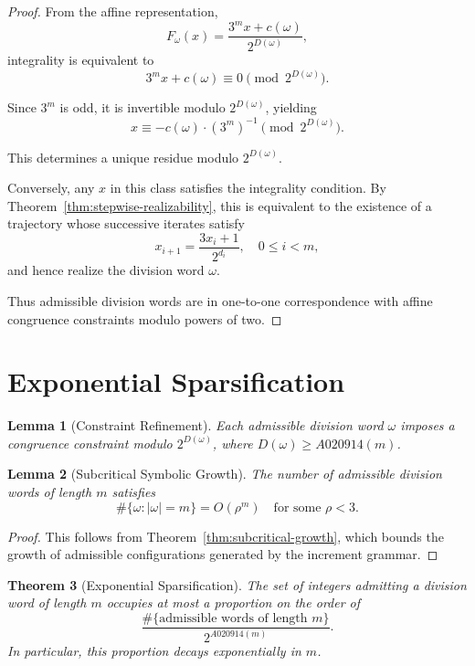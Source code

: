\documentclass[12pt, oneside]{article}
\numberwithin{equation}{section}
\theoremstyle{definition}
\theoremstyle{plain}
\newtheorem{theorem}{Theorem}[section]
\newtheorem{lemma}[theorem]{Lemma}
\theoremstyle{remark}
\begin{document}
\begin{proof}
From the affine representation,
\[
F_\omega(x) = \frac{3^m x + c(\omega)}{2^{D(\omega)}},
\]
integrality is equivalent to
\[
3^m x + c(\omega) \equiv 0 \pmod{2^{D(\omega)}}.
\]

Since $3^m$ is odd, it is invertible modulo $2^{D(\omega)}$, yielding
\[
x \equiv -c(\omega) \cdot (3^m)^{-1} \pmod{2^{D(\omega)}}.
\]

This determines a unique residue modulo $2^{D(\omega)}$.

Conversely, any $x$ in this class satisfies the integrality condition.
By Theorem~\ref{thm:stepwise-realizability}, this is equivalent to the
existence of a trajectory whose successive iterates satisfy
\[
x_{i+1} = \frac{3x_i+1}{2^{d_i}}, \quad 0 \le i < m,
\]
and hence realize the division word $\omega$.

Thus admissible division words are in one-to-one correspondence with affine
congruence constraints modulo powers of two.
\end{proof}

\section{Exponential Sparsification}
\label{sec:exponential-sparsification}

\begin{lemma}[Constraint Refinement]
Each admissible division word $\omega$ imposes a congruence constraint
modulo $2^{D(\omega)}$, where $D(\omega) \ge A020914(m)$.
\end{lemma}

\begin{lemma}[Subcritical Symbolic Growth]
The number of admissible division words of length $m$ satisfies
\[
\#\{\omega : |\omega|=m\} = O(\rho^m)
\quad \text{for some } \rho < 3.
\]
\end{lemma}

\begin{proof}
This follows from Theorem~\ref{thm:subcritical-growth}, which bounds the growth
of admissible configurations generated by the increment grammar.
\end{proof}

\begin{theorem}[Exponential Sparsification]
The set of integers admitting a division word of length $m$ occupies at most
a proportion on the order of
\[
\frac{\#\{\text{admissible words of length } m\}}{2^{A020914(m)}}.
\]
In particular, this proportion decays exponentially in $m$.
\end{theorem}
\end{document}

